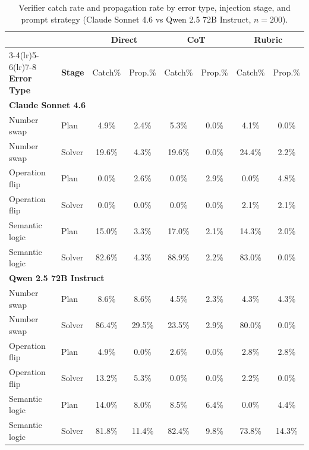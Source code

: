 \documentclass[11pt]{article}
\begin{document}
\begin{table}[H]
\centering\small
\begin{tabular}{llcccccc}
\toprule
& & \multicolumn{2}{c}{\textbf{Direct}} & \multicolumn{2}{c}{\textbf{CoT}} & \multicolumn{2}{c}{\textbf{Rubric}} \\
\cmidrule(lr){3-4}\cmidrule(lr){5-6}\cmidrule(lr){7-8}
\textbf{Error Type} & \textbf{Stage} & Catch\% & Prop.\% & Catch\% & Prop.\% & Catch\% & Prop.\% \\
\midrule
\multicolumn{8}{l}{\textbf{Claude Sonnet 4.6}} \\
Number swap    & Plan   & 4.9\%  & 2.4\%  & 5.3\%  & 0.0\%  & 4.1\%  & 0.0\%  \\
Number swap    & Solver & 19.6\% & 4.3\%  & 19.6\% & 0.0\%  & 24.4\% & 2.2\%  \\
Operation flip & Plan   & 0.0\%  & 2.6\%  & 0.0\%  & 2.9\%  & 0.0\%  & 4.8\%  \\
Operation flip & Solver & 0.0\%  & 0.0\%  & 0.0\%  & 0.0\%  & 2.1\%  & 2.1\%  \\
Semantic logic & Plan   & 15.0\% & 3.3\%  & 17.0\% & 2.1\%  & 14.3\% & 2.0\%  \\
Semantic logic & Solver & 82.6\% & 4.3\%  & 88.9\% & 2.2\%  & 83.0\% & 0.0\%  \\
\midrule
\multicolumn{8}{l}{\textbf{Qwen 2.5 72B Instruct}} \\
Number swap    & Plan   & 8.6\%  & 8.6\%  & 4.5\%  & 2.3\%  & 4.3\%  & 4.3\%  \\
Number swap    & Solver & 86.4\% & 29.5\% & 23.5\% & 2.9\%  & 80.0\% & 0.0\%  \\
Operation flip & Plan   & 4.9\%  & 0.0\%  & 2.6\%  & 0.0\%  & 2.8\%  & 2.8\%  \\
Operation flip & Solver & 13.2\% & 5.3\%  & 0.0\%  & 0.0\%  & 2.2\%  & 0.0\%  \\
Semantic logic & Plan   & 14.0\% & 8.0\%  & 8.5\%  & 6.4\%  & 0.0\%  & 4.4\%  \\
Semantic logic & Solver & 81.8\% & 11.4\% & 82.4\% & 9.8\%  & 73.8\% & 14.3\%  \\
\bottomrule
\end{tabular}
\caption{Verifier catch rate and propagation rate by error type, injection stage, and prompt strategy (Claude Sonnet 4.6 vs Qwen 2.5 72B Instruct, $n=200$).}\label{tab:errortype}
\end{table}
\end{document}
